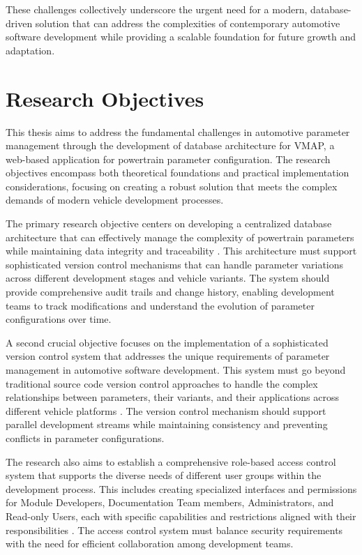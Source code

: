 These challenges collectively underscore the urgent need for a modern, database-driven solution that can address the complexities of contemporary automotive software development while providing a scalable foundation for future growth and adaptation.

\section{Research Objectives}
\label{sec:objectives}

This thesis aims to address the fundamental challenges in automotive parameter management through the development of database architecture for \ac{VMAP}, a web-based application for powertrain parameter configuration. The research objectives encompass both theoretical foundations and practical implementation considerations, focusing on creating a robust solution that meets the complex demands of modern vehicle development processes.

The primary research objective centers on developing a centralized database architecture that can effectively manage the complexity of powertrain parameters while maintaining data integrity and traceability \cite{williams2004web}. This architecture must support sophisticated version control mechanisms that can handle parameter variations across different development stages and vehicle variants. The system should provide comprehensive audit trails and change history, enabling development teams to track modifications and understand the evolution of parameter configurations over time.

A second crucial objective focuses on the implementation of a sophisticated version control system that addresses the unique requirements of parameter management in automotive software development. This system must go beyond traditional source code version control approaches to handle the complex relationships between parameters, their variants, and their applications across different vehicle platforms \cite{staron2021automotive}. The version control mechanism should support parallel development streams while maintaining consistency and preventing conflicts in parameter configurations.

The research also aims to establish a comprehensive role-based access control system that supports the diverse needs of different user groups within the development process. This includes creating specialized interfaces and permissions for Module Developers, Documentation Team members, Administrators, and Read-only Users, each with specific capabilities and restrictions aligned with their responsibilities \cite{sandhu1998role}. The access control system must balance security requirements with the need for efficient collaboration among development teams.

